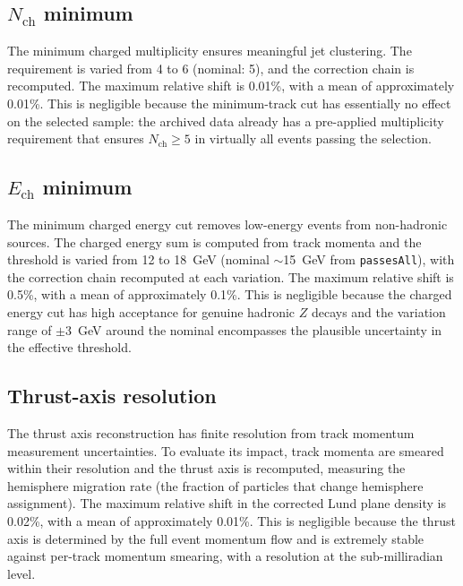 \documentclass[11pt,a4paper]{article}
\begin{document}
\subsection{$N_\text{ch}$ minimum}
\label{sec:syst-nch}

The minimum charged multiplicity ensures meaningful jet clustering.
The requirement is varied from 4 to 6 (nominal: 5), and the
correction chain is recomputed.  The maximum relative shift is
0.01\%, with a mean of approximately 0.01\%.  This is negligible
because the minimum-track cut has essentially no effect on the
selected sample: the archived data already has a pre-applied
multiplicity requirement that ensures $N_{\text{ch}} \geq 5$ in
virtually all events passing the selection.

\subsection{$E_\text{ch}$ minimum}
\label{sec:syst-ech}

The minimum charged energy cut removes low-energy events from
non-hadronic sources.  The charged energy sum is computed from track
momenta and the threshold is varied from 12 to 18~GeV (nominal
$\sim$15~GeV from \texttt{passesAll}), with the correction chain
recomputed at each variation.  The maximum relative shift is 0.5\%,
with a mean of approximately 0.1\%.  This is negligible because the
charged energy cut has high acceptance for genuine hadronic $Z$ decays
and the variation range of $\pm 3$~GeV around the nominal encompasses
the plausible uncertainty in the effective threshold.

\subsection{Thrust-axis resolution}
\label{sec:syst-thrust-axis}

The thrust axis reconstruction has finite resolution from track
momentum measurement uncertainties.  To evaluate its impact, track
momenta are smeared within their resolution and the thrust axis is
recomputed, measuring the hemisphere migration rate (the fraction of
particles that change hemisphere assignment).  The maximum relative
shift in the corrected Lund plane density is 0.02\%, with a mean of
approximately 0.01\%.  This is negligible because the thrust axis is
determined by the full event momentum flow and is extremely stable
against per-track momentum smearing, with a resolution at the
sub-milliradian level.
\end{document}
